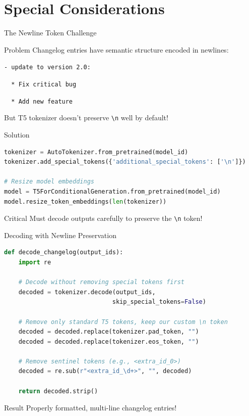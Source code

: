 \section{Special Considerations}
\begin{frame}[fragile]{The Newline Token Challenge}
\begin{block}{Problem}
Changelog entries have semantic structure encoded in newlines:

\texttt{- update to version 2.0:}

\texttt{~~* Fix critical bug}

\texttt{~~* Add new feature}

But T5 tokenizer doesn't preserve \texttt{\textbackslash n} well by default!
\end{block}

\begin{block}{Solution}
\begin{lstlisting}[language=Python]
tokenizer = AutoTokenizer.from_pretrained(model_id)
tokenizer.add_special_tokens({'additional_special_tokens': ['\n']})

# Resize model embeddings
model = T5ForConditionalGeneration.from_pretrained(model_id)
model.resize_token_embeddings(len(tokenizer))
\end{lstlisting}
\end{block}

\begin{alertblock}{Critical}
Must decode outputs carefully to preserve the \texttt{\textbackslash n} token!
\end{alertblock}
\end{frame}

\begin{frame}[fragile]{Decoding with Newline Preservation}
\begin{lstlisting}[language=Python, basicstyle=\ttfamily\small]
def decode_changelog(output_ids):
    import re

    # Decode without removing special tokens first
    decoded = tokenizer.decode(output_ids,
                              skip_special_tokens=False)

    # Remove only standard T5 tokens, keep our custom \n token
    decoded = decoded.replace(tokenizer.pad_token, "")
    decoded = decoded.replace(tokenizer.eos_token, "")

    # Remove sentinel tokens (e.g., <extra_id_0>)
    decoded = re.sub(r"<extra_id_\d+>", "", decoded)

    return decoded.strip()
\end{lstlisting}

\begin{block}{Result}
Properly formatted, multi-line changelog entries!
\end{block}
\end{frame}

